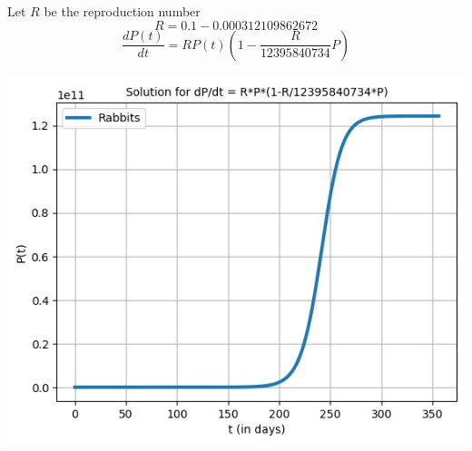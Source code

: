 \documentclass{article}
\begin{document}
Let $R$ be the reproduction number
$$
R = 0.1 - 0.000312109862672
$$
$$
\frac{dP(t)}{dt} = RP(t)(1-\frac{R}{12 395 840 734}P)
$$
\\
\includegraphics{Pictures/logis}
\end{document}
